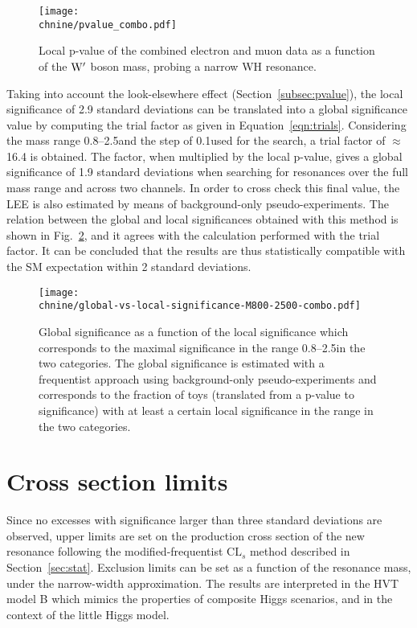 \begin{figure}[htb]
\centering
     \texttt{[image: \\chnine/pvalue\_combo.pdf]}
\caption{
  Local p-value of the combined electron and muon data as a function of the $\mathrm{W}^\prime$ boson mass,
  probing a narrow WH resonance.
}
\label{fig:sigWH}
\end{figure}

Taking into account the look-elsewhere effect (Section~\ref{subsec:pvalue}), the local significance of 2.9 standard deviations can be translated into a global significance value by computing the trial factor as given in Equation~\ref{eqn:trials}. 
Considering the mass range 0.8--2.5\TeV and the step of 0.1\TeV used for the search, a trial factor of $\approx$ 16.4 is obtained. The factor, when multiplied by the local p-value, gives a global significance of 1.9 standard deviations
when searching for resonances over the full mass range and across two channels.
In order to cross check this final value, the LEE is also estimated by means of background-only pseudo-experiments. The relation between the global and local significances obtained with this method is shown in Fig.~\ref{fig:sigGlobWH},
and it agrees with the calculation performed with the trial factor.
It can be concluded that the results are thus statistically compatible with the SM expectation within 2 standard deviations.

\begin{figure}[htb]
\centering
     \texttt{[image: \\chnine/global-vs-local-significance-M800-2500-combo.pdf]}
\caption{
  Global significance as a function of the local significance which corresponds to the maximal significance in the \mWH range 0.8--2.5\TeV in the two categories. The global significance is estimated with a frequentist approach using background-only pseudo-experiments and corresponds to the fraction of toys (translated from a p-value to significance) with at least a certain local significance in the \mWH range in the two categories.
}
\label{fig:sigGlobWH}
\end{figure}

\section{Cross section limits}

Since no excesses with significance larger than three standard deviations are observed, upper limits are set on the production cross section of the new resonance following the modified-frequentist $\mathrm{CL}_s$ method
described in Section~\ref{sec:stat}. Exclusion limits can be set as a function of the \Wpr resonance mass, under the narrow-width approximation.
The results are interpreted in the HVT model B which mimics the properties of composite Higgs scenarios, and in the context of the little Higgs model.

